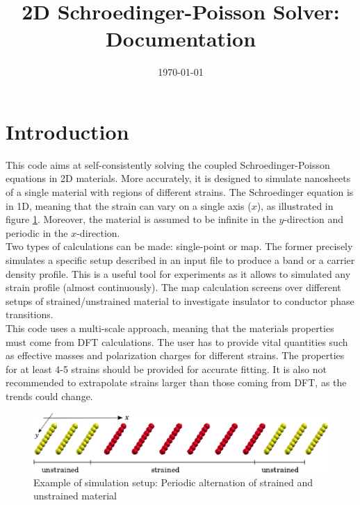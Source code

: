 \documentclass[a4paper,12pt]{article}
\begin{document}
\title{\textbf{\Huge { 2D Schroedinger-Poisson Solver: Documentation}}}
\date{\today}
\maketitle

\section{Introduction}

This code aims at self-consistently solving the coupled Schroedinger-Poisson equations in 2D materials. More accurately, it is designed to simulate nanosheets of a single material with regions of different strains. The Schroedinger equation is in 1D, meaning that the strain can vary on a single axis ($x$), as illustrated in figure \ref{fig:example1}. Moreover, the material is assumed to be infinite in the $y$-direction and periodic in the $x$-direction.\\

Two types of calculations can be made: single-point or map. The former precisely simulates a specific setup described in an input file to produce a band or a carrier density profile. This is a useful tool for experiments as it allows to simulated any strain profile (almost continuously). The map calculation screens over different setups of strained/unstrained material to investigate insulator to conductor phase transitions.\\

This code uses a multi-scale approach, meaning that the materials properties must come from DFT calculations. The user has to provide vital quantities such as effective masses and polarization charges  for different strains. The properties for at least 4-5 strains should be provided for accurate fitting. It is also not recommended to extrapolate strains larger than those coming from DFT, as the trends could change.

\begin{figure} [h]
\begin{center}
\captionsetup{width=0.8\textwidth}
\centerline{\includegraphics[width=12cm,angle=0]{example1.eps}}
\caption{Example of simulation setup: Periodic alternation of strained and unstrained material}
\label{fig:example1} 
\end{center}
\end{figure}
\end{document}
